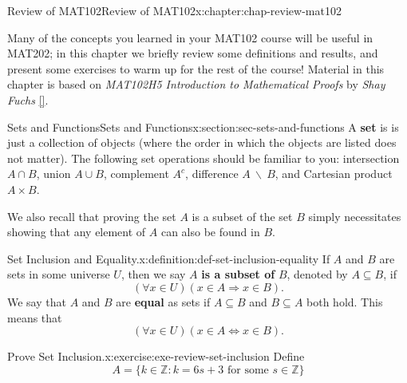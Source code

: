 \documentclass[oneside,10pt,]{book}
\newcommand{\xreffont}{\relax}
\newcommand{\terminology}[1]{\textbf{#1}}
\newcommand{\pubtitle}[1]{\textsl{#1}}
\numberwithin{equation}{section}
\begin{document}
\begin{chapterptx}{Review of MAT102}{}{Review of MAT102}{}{}{x:chapter:chap-review-mat102}
\begin{introduction}{}%
Many of the concepts you learned in your MAT102 course will be useful in MAT202; in this chapter we briefly review some definitions and results, and present some exercises to warm up for the rest of the course! Material in this chapter is based on \pubtitle{MAT102H5 Introduction to Mathematical Proofs} by \emph{Shay Fuchs} \hyperlink{x:biblio:bib-fuchs-102}{[{\xreffont 3}]}.%
\end{introduction}%
%
%
\typeout{************************************************}
\typeout{************************************************}
%
\begin{sectionptx}{Sets and Functions}{}{Sets and Functions}{}{}{x:section:sec-sets-and-functions}
A \terminology{set} is is just a collection of objects (where the order in which the objects are listed does not matter). The following set operations should be familiar to you: intersection \(A \cap B\), union \(A \cup B\), complement \(A^c\), difference \(A \ \backslash \ B\), and Cartesian product \(A \times B\).%
\par
We also recall that proving the set \(A\) is a subset of the set \(B\) simply necessitates showing that any element of \(A\) can also be found in \(B\).%
\begin{definition}{Set Inclusion and Equality.}{x:definition:def-set-inclusion-equality}%
\label{g:notation:id438299} If \(A\) and \(B\) are sets in some universe \(U\), then we say \(A\) \terminology{is a subset of} \(B\), denoted by \(A \subseteq B\), if%
\begin{equation*}
(\forall x \in U)(x \in A \Rightarrow x \in B)\text{.}
\end{equation*}
We say that \(A\) and \(B\) are \terminology{equal} as sets if \(A \subseteq B\) and \(B \subseteq A\) both hold. This means that%
\begin{equation*}
(\forall x \in U)(x \in A \Leftrightarrow x \in B)\text{.}
\end{equation*}
%
\end{definition}
\begin{inlineexercise}{Prove Set Inclusion.}{x:exercise:exe-review-set-inclusion}%
Define%
\begin{equation*}
A = \{k \in \mathbb{Z} : k = 6s + 3 \text{ for some } s \in \mathbb{Z}\}
\end{equation*}

\end{inlineexercise}
\end{sectionptx}
\end{chapterptx}
\end{document}
